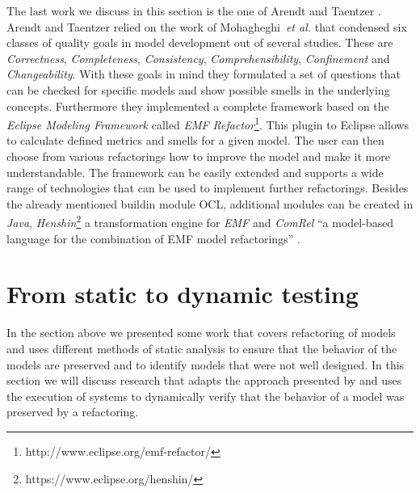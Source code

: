 \documentclass{llncs}
\begin{document}
The last work we discuss in this section is the one of Arendt and Taentzer \cite{DBLP:conf/models/ArendtTW13}.
Arendt and Taentzer relied on the work of Mohagheghi~\textit{et al.} \cite{DBLP:journals/infsof/MohagheghiDN09} that condensed
six classes of quality goals in model development out of several studies. These are \textit{Correctness},
\textit{Completeness}, \textit{Consistency}, \textit{Comprehensibility}, \textit{Confinement} and
\textit{Changeability}. With these goals in mind they formulated a set of questions that can be checked for specific
models and show possible smells in the underlying concepts. Furthermore they implemented a complete framework based
on the \textit{Eclipse Modeling Framework} \cite{Steinberg:2009:EEM:1197540} called \textit{EMF
Refactor}\footnote{http://www.eclipse.org/emf-refactor/}. This plugin to Eclipse allows to calculate defined
metrics and smells for a given model. The user can then choose from various refactorings how to improve the
model and make it more understandable. The framework can be easily extended and supports a wide range of technologies
that can be used to implement further refactorings. Besides the already mentioned buildin module OCL,
additional modules can be created in \textit{Java}, \textit{Henshin}\footnote{https://www.eclipse.org/henshin/} a
transformation engine for \textit{EMF} and \textit{ComRel} ``a model-based language for the combination of EMF model
refactorings'' \cite{DBLP:journals/infsof/MohagheghiDN09}.

\section{From static to dynamic testing}
\label{sec:todynamics}

In the section above we presented some work that covers refactoring of models and uses different methods of static
analysis to ensure that the behavior of the models are preserved and to identify models that were not well designed. In
this section we will discuss research that adapts the approach presented by \cite{rob99} and uses the execution of
systems to dynamically verify that the behavior of a model was preserved by a refactoring.
\end{document}
